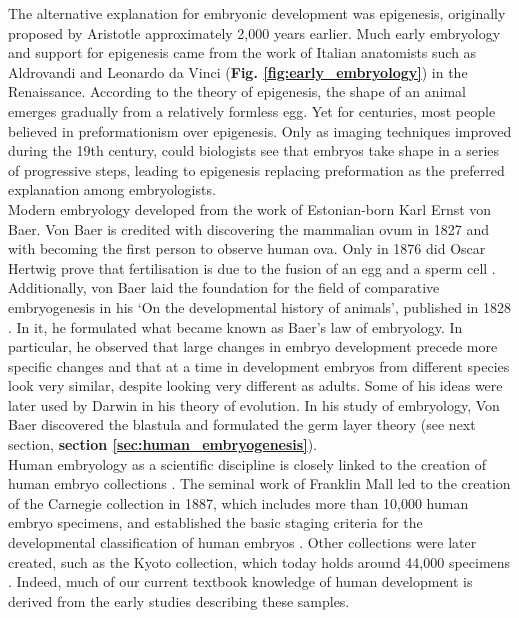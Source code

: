 The alternative explanation for embryonic development was epigenesis, originally proposed by Aristotle approximately 2,000 years earlier. 
Much early embryology and support for epigenesis came from the work of Italian anatomists such as Aldrovandi and Leonardo da Vinci (\textbf{Fig. \ref{fig:early_embryology}}) in the Renaissance.
According to the theory of epigenesis, the shape of an animal emerges gradually from a relatively formless egg. 
Yet for centuries, most people believed in preformationism over epigenesis.
Only as imaging techniques improved during the 19th century, could biologists see that embryos take shape in a series of progressive steps, leading to epigenesis replacing preformation as the preferred explanation among embryologists.\\

Modern embryology developed from the work of Estonian-born Karl Ernst von Baer.
Von Baer is credited with discovering the mammalian ovum in 1827 and with becoming the first person to observe human ova.
Only in 1876 did Oscar Hertwig prove that fertilisation is due to the fusion of an egg and a sperm cell \cite{hertwig1875beitraege}.
Additionally, von Baer laid the foundation for the field of comparative embryogenesis in his `On the developmental history of animals', published in 1828 \cite{von1828entwickelungsgeschichte}.
In it, he formulated what became known as Baer's law of embryology.
In particular, he observed that large changes in embryo development precede more specific changes and that at a time in development embryos from different species look very similar, despite looking very different as adults.
Some of his ideas were later used by Darwin in his theory of evolution.
In his study of embryology, Von Baer discovered the blastula and formulated the germ layer theory (see next section, \textbf{section \ref{sec:human_embryogenesis}}).\\

\label{sec:carnegie_collection}
Human embryology as a scientific discipline is closely linked to the creation of human embryo collections \cite{yamada2015human, gasser2014rebirth, shahbazi2020mechanisms}. 
The seminal work of Franklin Mall led to the creation of the Carnegie collection in 1887, which includes more than 10,000 human embryo specimens, and established the basic staging criteria for the developmental classification of human embryos \cite{keibel1910manual}. 
Other collections were later created, such as the Kyoto collection, which today holds around 44,000 specimens \cite{nishimura1968normal}. 
Indeed, much of our current textbook knowledge of human development is derived from the early studies describing these samples.\\

